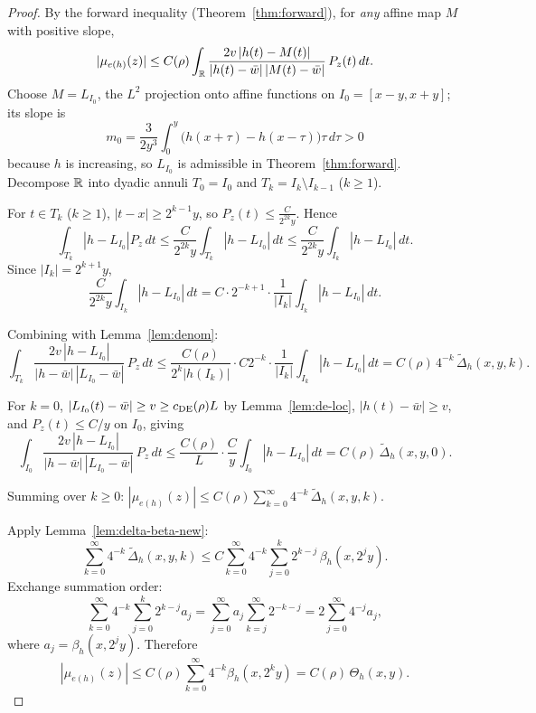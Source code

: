 \begin{proof}
	By the forward inequality (Theorem~\ref{thm:forward}), for \emph{any} affine map $M$ with positive slope,
	\[
	|\mu_{e(h)}(z)|
	\le C(\rho)\int_{\mathbb{R}}\frac{2v\,|h(t)-M(t)|}{|h(t)-\bar w|\,|M(t)-\bar w|}\,P_z(t)\,dt.
	\]
	Choose $M=L_{I_0}$, the $L^2$ projection onto affine functions on $I_0=[x-y,x+y]$; its slope is
	\[
	m_0=\frac{3}{2y^3}\int_0^{y}\bigl(h(x+\tau)-h(x-\tau)\bigr)\tau\,d\tau>0
	\]
	because $h$ is increasing, so $L_{I_0}$ is admissible in Theorem~\ref{thm:forward}. Decompose $\mathbb{R}$ into dyadic annuli $T_0=I_0$ and $T_k=I_k\setminus I_{k-1}$ ($k\ge1$).
	
	
	
	
	
	
	For $t\in T_k$ ($k\ge1$), $|t-x|\ge 2^{k-1}y$, so $P_z(t)\le\frac{C}{2^{2k}y}$.
	Hence
	\[
	\int_{T_k}|h-L_{I_0}|P_z\,dt
	\le\frac{C}{2^{2k}y}\int_{T_k}|h-L_{I_0}|\,dt
	\le\frac{C}{2^{2k}y}\int_{I_k}|h-L_{I_0}|\,dt .
	\]
	Since $|I_k|=2^{k+1}y$,
	\[
	\frac{C}{2^{2k}y}\int_{I_k}|h-L_{I_0}|\,dt
	=C\cdot 2^{-k+1}\cdot\frac{1}{|I_k|}\int_{I_k}|h-L_{I_0}|\,dt .
	\]
	
	Combining with Lemma~\ref{lem:denom}:
	\[
	\int_{T_k}\frac{2v\,|h-L_{I_0}|}{|h-\bar w|\,|L_{I_0}-\bar w|}\,P_z\,dt
	\le\frac{C(\rho)}{2^k|h(I_k)|}\cdot C 2^{-k}\cdot
	\frac{1}{|I_k|}\int_{I_k}|h-L_{I_0}|\,dt
	=C(\rho)\,4^{-k}\,\widetilde\Delta_h(x,y,k) .
	\]
	
	For $k=0$, $|L_{I_0}(t)-\bar w|\ge v\ge c_{\rm DE}(\rho)L$ by
	Lemma~\ref{lem:de-loc}, $|h(t)-\bar w|\ge v$, and
	$P_z(t)\le C/y$ on $I_0$, giving
	\[
	\int_{I_0}\frac{2v\,|h-L_{I_0}|}{|h-\bar w|\,|L_{I_0}-\bar w|}\,P_z\,dt
	\le\frac{C(\rho)}{L}\cdot\frac{C}{y}\int_{I_0}|h-L_{I_0}|\,dt
	=C(\rho)\,\widetilde\Delta_h(x,y,0) .
	\]
	
	
	
	Summing over $k\ge0$: $|\mu_{e(h)}(z)|\le C(\rho)\sum_{k=0}^{\infty}4^{-k}\,\widetilde\Delta_h(x,y,k)$.
	
	Apply Lemma~\ref{lem:delta-beta-new}:
	\[
	\sum_{k=0}^{\infty}4^{-k}\,\widetilde\Delta_h(x,y,k)
	\le C\sum_{k=0}^{\infty}4^{-k}\sum_{j=0}^k 2^{k-j}\,\beta_h(x,2^j y).
	\]
	Exchange summation order:
	\[
	\sum_{k=0}^{\infty}4^{-k}\sum_{j=0}^k 2^{k-j}a_j
	=\sum_{j=0}^{\infty}a_j\sum_{k=j}^{\infty}2^{-k-j}
	=2\sum_{j=0}^{\infty}4^{-j}a_j,
	\]
	where $a_j=\beta_h(x,2^j y)$. Therefore
	\[
	|\mu_{e(h)}(z)|\le C(\rho)\sum_{k=0}^{\infty}4^{-k}\beta_h(x,2^k y)=C(\rho)\,\Theta_h(x,y).
	\]
\end{proof}
